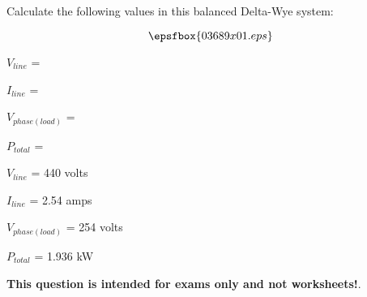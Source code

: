 

Calculate the following values in this balanced Delta-Wye system:

$$\epsfbox{03689x01.eps}$$

\medskip
\item{} $V_{line}$ =
\vskip 5pt
\item{} $I_{line}$ =
\vskip 5pt
\item{} $V_{phase(load)}$ =
\vskip 5pt
\item{} $P_{total}$ =
\medskip







\medskip
\item{} $V_{line}$ = 440 volts
\vskip 5pt
\item{} $I_{line}$ = 2.54 amps
\vskip 5pt
\item{} $V_{phase(load)}$ = 254 volts
\vskip 5pt
\item{} $P_{total}$ = 1.936 kW
\medskip







{\bf This question is intended for exams only and not worksheets!}.




